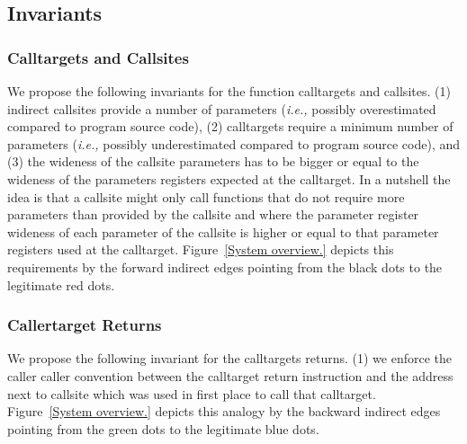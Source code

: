 \subsection{Invariants}
\label{Invariants for Targets and Callsites}

\subsubsection{Calltargets and Callsites}
We propose the following invariants for the function calltargets and callsites.
(1) indirect callsites provide a number of parameters (\textit{i.e.,} possibly overestimated compared to program source code), 
(2) calltargets require a minimum number of parameters (\textit{i.e.,} possibly underestimated compared to program source code), and
(3) the wideness of the callsite parameters has to be bigger or equal to the wideness of the parameters registers expected at the calltarget.
In a nutshell the idea is that a callsite might only call functions that do not require more parameters than provided by the callsite and
where the parameter register wideness of each parameter of the callsite is higher or equal to that parameter registers used at the calltarget.
Figure~\ref{System overview.} depicts this requirements by the forward indirect edges pointing from the black dots to the legitimate
red dots.

\subsubsection{Callertarget Returns}
We propose the following invariant for the calltargets returns.
(1) we enforce the caller caller convention between the calltarget return instruction and the address next to callsite which was used in first place to 
call that calltarget.
Figure~\ref{System overview.} depicts this analogy by the backward indirect edges pointing from the green dots to the legitimate
blue dots.

